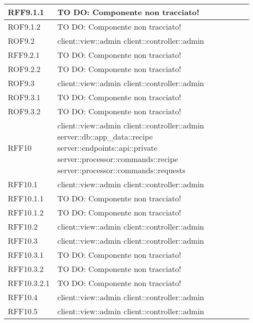 \begin{center}
\begin{longtable}{| p{4cm} | p{8cm} |}
\hline
RFF9.1.1 & TO DO: Componente non tracciato! \\
\hline
ROF9.1.2 & TO DO: Componente non tracciato! \\
\hline
ROF9.2 & client::view::admin \newline client::controller::admin \\
\hline
RFF9.2.1 & TO DO: Componente non tracciato! \\
\hline
ROF9.2.2 & TO DO: Componente non tracciato! \\
\hline
ROF9.3 & client::view::admin \newline client::controller::admin \\
\hline
ROF9.3.1 & TO DO: Componente non tracciato! \\
\hline
ROF9.3.2 & TO DO: Componente non tracciato! \\
\hline
RFF10 & client::view::admin \newline client::controller::admin \newline server::db::app\_data::recipe \newline server::endpoints::api::private \newline server::processor::commands::recipe \newline server::processor::commands::requests \\
\hline
RFF10.1 & client::view::admin \newline client::controller::admin \\
\hline
RFF10.1.1 & TO DO: Componente non tracciato! \\
\hline
RFF10.1.2 & TO DO: Componente non tracciato! \\
\hline
RFF10.2 & client::view::admin \newline client::controller::admin \\
\hline
RFF10.3 & client::view::admin \newline client::controller::admin \\
\hline
RFF10.3.1 & TO DO: Componente non tracciato! \\
\hline
RFF10.3.2 & TO DO: Componente non tracciato! \\
\hline
RFF10.3.2.1 & TO DO: Componente non tracciato! \\
\hline
RFF10.4 & client::view::admin \newline client::controller::admin \\
\hline
RFF10.5 & client::view::admin \newline client::controller::admin \\

\end{longtable}
\end{center}
